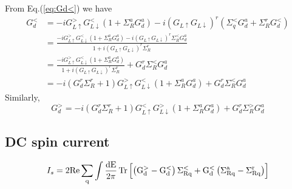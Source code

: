 \documentclass[aps,prb,onecolumn,amssymb,amsmath,superscriptaddress]{revtex4-1}
\begin{document}
From Eq.(\ref{eq:Gd<}) we have
\begin{equation}
\begin{split}
G_{d}^{<}&=-i G_{L \uparrow}^{>} G_{L \downarrow}^{<}\left(1+\Sigma_{R}^{a} G_{d}^{a}\right)-i\left(G_{L \uparrow} G_{L \downarrow}\right)^{r}\left(\Sigma_{q}^{<} G_{d}^{a}+\Sigma_{R}^{r} G_{d}^{<}\right)\\
&=\frac{-i G_{L \uparrow}^{>} G_{L \downarrow}^{<}\left(1+\Sigma_{R}^{a} G_{d}^{a}\right) - i\left(G_{L \uparrow} G_{L \downarrow}\right)^{r}\Sigma_{R}^{<} G_{d}^{a}}{1+i\left(G_{L \uparrow} G_{L \downarrow}\right)^{r}\Sigma_{R}^{r}} \\
&=\frac{-i G_{L \uparrow}^{>} G_{L \downarrow}^{<}\left(1+\Sigma_{R}^{a} G_{d}^{a}\right)}{1+i\left(G_{L \uparrow} G_{L \downarrow}\right)^{r}\Sigma_{R}^{r}} + G_{d}^{r}\Sigma_{R}^{<} G_{d}^{a}\\
&=-i(G_{d}^{r}\Sigma_{R}^{r}+1) G_{L \uparrow}^{>} G_{L \downarrow}^{<}\left(1+\Sigma_{R}^{a} G_{d}^{a}\right) + G_{d}^{r}\Sigma_{R}^{<} G_{d}^{a}
\end{split}
\end{equation}
Similarly,
\begin{equation}
G_{d}^{>}=-i\left(G_{d}^{r} \Sigma_{R}^{r}+1\right) G_{L \uparrow}^{<} G_{L \downarrow}^{>}\left(1+\Sigma_{R}^{a} G_{d}^{a}\right)+G_{d}^{r} \Sigma_{R}^{>} G_{d}^{a}
\end{equation}
\subsection{DC spin current}

\begin{equation}
I_{s}= 2\rm{Re}\sum_{q} \int  \frac{dE}{2\pi}\operatorname{Tr}\left[\left(G_{d}^{>}-G_{d}^{<}\right) \Sigma_{R q}^{<}+G_{d}^{<}\left(\Sigma_{R q}^{a}-\Sigma_{R q}^{r}\right)\right]
\label{eq:current1}
\end{equation}
\end{document}
